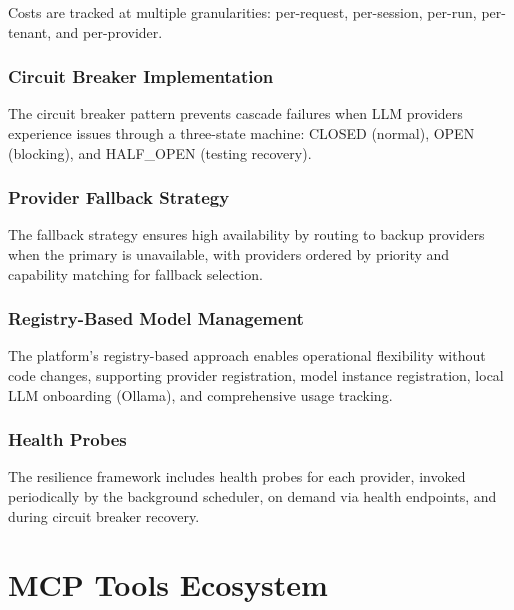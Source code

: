\documentclass[a4paper,twoside]{sapthesis}
\begin{document}
Costs are tracked at multiple granularities: per-request, per-session, per-run, per-tenant, and per-provider.

\subsection{Circuit Breaker Implementation}
\label{subsubsec:circuit-breaker}

The circuit breaker pattern prevents cascade failures when LLM providers experience issues through a three-state machine: CLOSED (normal), OPEN (blocking), and HALF\_OPEN (testing recovery).

\subsection{Provider Fallback Strategy}
\label{subsubsec:fallback-strategy}

The fallback strategy ensures high availability by routing to backup providers when the primary is unavailable, with providers ordered by priority and capability matching for fallback selection.

\subsection{Registry-Based Model Management}
\label{subsec:registry-model-management}

The platform's registry-based approach enables operational flexibility without code changes, supporting provider registration, model instance registration, local LLM onboarding (Ollama), and comprehensive usage tracking.

\subsection{Health Probes}

The resilience framework includes health probes for each provider, invoked periodically by the background scheduler, on demand via health endpoints, and during circuit breaker recovery.


\chapter{MCP Tools Ecosystem}
\label{ch:mcp-tools}
\end{document}
